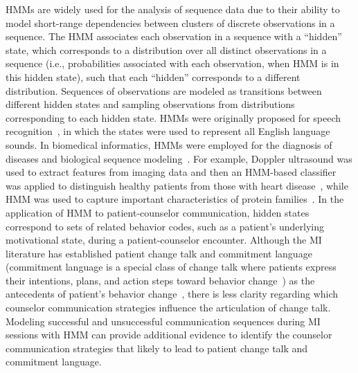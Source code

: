HMMs are widely used for the analysis of sequence data due to their ability to model short-range dependencies between clusters of discrete observations in a sequence. The HMM associates each observation in a sequence with a ``hidden'' state, which corresponds to a distribution over all distinct observations in a sequence (i.e., probabilities associated with each observation, when HMM is in this hidden state), such that each ``hidden'' corresponds to a different distribution. Sequences of observations are modeled as transitions between different hidden states and sampling observations from distributions corresponding to each hidden state. HMMs were originally proposed for speech recognition~\cite{rabiner1989tutorial}, in which the states were used to represent all English language sounds. In biomedical informatics, HMMs were employed for the diagnosis of diseases and biological sequence modeling~\cite{uuguz2007biomedical, amrhein2003client}. For example, Doppler ultrasound was used to extract features from imaging data and then an HMM-based classifier was applied to distinguish healthy patients from those with heart disease~\cite{uuguz2007biomedical}, while HMM was used to capture important characteristics of protein families~\cite{amrhein2003client}. In the application of HMM to patient-counselor communication, hidden states correspond to sets of related behavior codes, such as a patient’s underlying motivational state, during a patient-counselor encounter. Although the MI literature has established patient change talk and commitment language (commitment language is a special class of change talk where patients express their intentions, plans, and action steps toward behavior change~\cite{baldi1994hidden}) as the antecedents of patient’s behavior change~\cite{apodaca2009mechanisms}, there is less clarity regarding which counselor communication strategies influence the articulation of change talk. Modeling successful and unsuccessful communication sequences during MI sessions with HMM can provide additional evidence to identify the counselor communication strategies that likely to lead to patient change talk and commitment language. 

